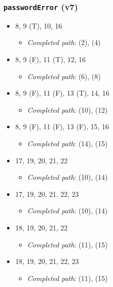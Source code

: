 \documentclass{article}
\newcommand{\completedpath}{\textit{Completed path}}
\begin{document}
\subsubsection*{\texttt{passwordError} (v7)}

\begin{itemize}
    \item 8, 9 (T), 10, 16
          \begin{itemize}
              \item \completedpath: (2), (4)
          \end{itemize}
    \item 8, 9 (F), 11 (T), 12, 16
          \begin{itemize}
              \item \completedpath: (6), (8)
          \end{itemize}
    \item 8, 9 (F), 11 (F), 13 (T), 14, 16
          \begin{itemize}
              \item \completedpath: (10), (12)
          \end{itemize}
    \item 8, 9 (F), 11 (F), 13 (F), 15, 16
          \begin{itemize}
              \item \completedpath: (14), (15)
          \end{itemize}
    \item 17, 19, 20, 21, 22
          \begin{itemize}
              \item \completedpath: (10), (14)
          \end{itemize}
    \item 17, 19, 20, 21, 22, 23
          \begin{itemize}
              \item \completedpath: (10), (14)
          \end{itemize}
    \item 18, 19, 20, 21, 22
          \begin{itemize}
              \item \completedpath: (11), (15)
          \end{itemize}
    \item 18, 19, 20, 21, 22, 23
          \begin{itemize}
              \item \completedpath: (11), (15)
          \end{itemize}
\end{itemize}
\end{document}
